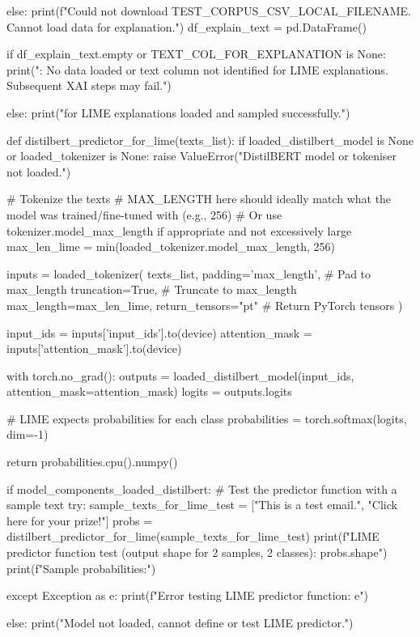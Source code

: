 \begin{ffcode}
else:
    print(f"Could not download {TEST_CORPUS_CSV_LOCAL_FILENAME}. Cannot load data for explanation.")
    df_explain_text = pd.DataFrame()

if df_explain_text.empty or TEXT_COL_FOR_EXPLANATION is None:
    print("\nWarning: No data loaded or text column not identified for LIME explanations. Subsequent XAI steps may fail.")

else:
    print("\nData for LIME explanations loaded and sampled successfully.")

def distilbert_predictor_for_lime(texts_list):
    if loaded_distilbert_model is None or loaded_tokenizer is None:
        raise ValueError("DistilBERT model or tokeniser not loaded.")

    # Tokenize the texts
    # MAX_LENGTH here should ideally match what the model was trained/fine-tuned with (e.g., 256)
    # Or use tokenizer.model_max_length if appropriate and not excessively large
    max_len_lime = min(loaded_tokenizer.model_max_length, 256)

    inputs = loaded_tokenizer(
        texts_list,
        padding='max_length', # Pad to max_length
        truncation=True,    # Truncate to max_length
        max_length=max_len_lime,
        return_tensors="pt" # Return PyTorch tensors
    )

    input_ids = inputs['input_ids'].to(device)
    attention_mask = inputs['attention_mask'].to(device)

    with torch.no_grad():
        outputs = loaded_distilbert_model(input_ids, attention_mask=attention_mask)
        logits = outputs.logits

        # LIME expects probabilities for each class
        probabilities = torch.softmax(logits, dim=-1)

    return probabilities.cpu().numpy()

if model_components_loaded_distilbert:
    # Test the predictor function with a sample text
    try:
        sample_texts_for_lime_test = ["This is a test email.", "Click here for your prize!"]
        probs = distilbert_predictor_for_lime(sample_texts_for_lime_test)
        print(f"LIME predictor function test (output shape for 2 samples, 2 classes): {probs.shape}")
        print(f"Sample probabilities:")

    except Exception as e:
        print(f"Error testing LIME predictor function: {e}")

else:
    print("Model not loaded, cannot define or test LIME predictor.")


\end{ffcode}
